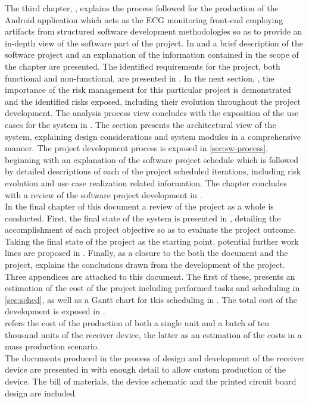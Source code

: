 		The third chapter, \emph{}, explains the process followed for the production of the Android application which acts as the ECG monitoring front-end employing artifacts from structured software development methodologies so as to provide an in-depth view of the software part of the project. In  and  a brief description of the software project and an explanation of the information contained in the scope of the chapter are presented. The identified requirements for the project, both functional and non-functional, are presented in . In the next section, \emph{}, the importance of the risk management for this particular project is demonstrated and the identified risks exposed, including their evolution throughout the project development. The analysis process view concludes with the exposition of the use cases for the system in . The \emph{} section presents the architectural view of the system, explaining design considerations and system modules in a comprehensive manner. The project development process is exposed in \autoref{sec:sw-process}, beginning with an explanation of the software project schedule which is followed by detailed descriptions of each of the project scheduled iterations, including risk evolution and use case realization related information. The chapter concludes with a review of the software project development in .\\

		In the final chapter of this document a review of the project as a whole is conducted. First, the final state of the system is presented in , detailing the accomplishment of each project objective so as to evaluate the project outcome. Taking the final state of the project as the starting point, potential further work lines are proposed in . Finally, as a closure to the both the document and the project,  explains the conclusions drawn from the development of the project.\\

		Three appendices are attached to this document. The first of these,  presents an estimation of the cost of the project including performed tasks and scheduling in \autoref{sec:sched}, as well as a Gantt chart for this scheduling in . The total cost of the development is exposed in .\\

		 refers the cost of the production of both a single unit and a batch of ten thousand units of the receiver device, the latter as an estimation of the costs in a mass production scenario.\\

		The documents produced in the process of design and development of the receiver device are presented in  with enough detail to allow custom production of the device. The bill of materials, the device schematic and the printed circuit board design are included.\\